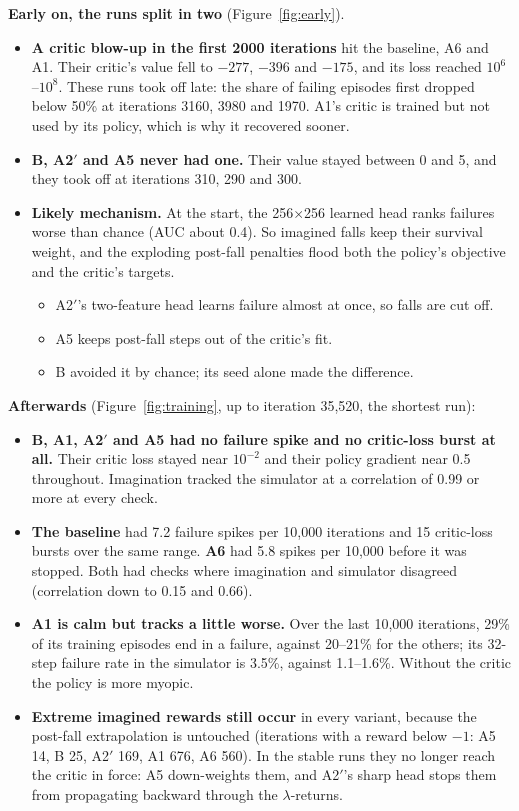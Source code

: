 \documentclass[10pt]{article}
\newcommand{\fig}[1]{Figure~\ref{#1}}
\begin{document}
\textbf{Early on, the runs split in two} (\fig{fig:early}).
\begin{itemize}
  \item \textbf{A critic blow-up in the first 2000 iterations} hit the baseline, A6 and A1. Their
  critic's value fell to $-277$, $-396$ and $-175$, and its loss reached $10^6$--$10^8$. These runs took
  off late: the share of failing episodes first dropped below 50\% at iterations 3160, 3980 and 1970.
  A1's critic is trained but not used by its policy, which is why it recovered sooner.
  \item \textbf{B, A2$'$ and A5 never had one.} Their value stayed between 0 and 5, and they took off at
  iterations 310, 290 and 300.
  \item \textbf{Likely mechanism.} At the start, the 256$\times$256 learned head ranks failures worse than
  chance (AUC about 0.4). So imagined falls keep their survival weight, and the exploding post-fall
  penalties flood both the policy's objective and the critic's targets.
  \begin{itemize}
    \item A2$'$'s two-feature head learns failure almost at once, so falls are cut off.
    \item A5 keeps post-fall steps out of the critic's fit.
    \item B avoided it by chance; its seed alone made the difference.
  \end{itemize}
\end{itemize}

\textbf{Afterwards} (\fig{fig:training}, up to iteration 35,520, the shortest run):
\begin{itemize}
  \item \textbf{B, A1, A2$'$ and A5 had no failure spike and no critic-loss burst at all.} Their
  critic loss stayed near $10^{-2}$ and their policy gradient near 0.5 throughout. Imagination tracked
  the simulator at a correlation of 0.99 or more at every check.
  \item \textbf{The baseline} had 7.2 failure spikes per 10,000 iterations and 15 critic-loss bursts over
  the same range. \textbf{A6} had 5.8 spikes per 10,000 before it was stopped. Both had checks where
  imagination and simulator disagreed (correlation down to 0.15 and 0.66).
  \item \textbf{A1 is calm but tracks a little worse.} Over the last 10,000 iterations, 29\% of its
  training episodes end in a failure, against 20--21\% for the others; its 32-step failure rate in the
  simulator is 3.5\%, against 1.1--1.6\%. Without the critic the policy is more myopic.
  \item \textbf{Extreme imagined rewards still occur} in every variant, because the post-fall
  extrapolation is untouched (iterations with a reward below $-1$: A5 14, B 25, A2$'$ 169, A1 676, A6 560).
  In the stable runs they no longer reach the critic in force: A5 down-weights them, and A2$'$'s sharp
  head stops them from propagating backward through the $\lambda$-returns.
\end{itemize}
\end{document}
